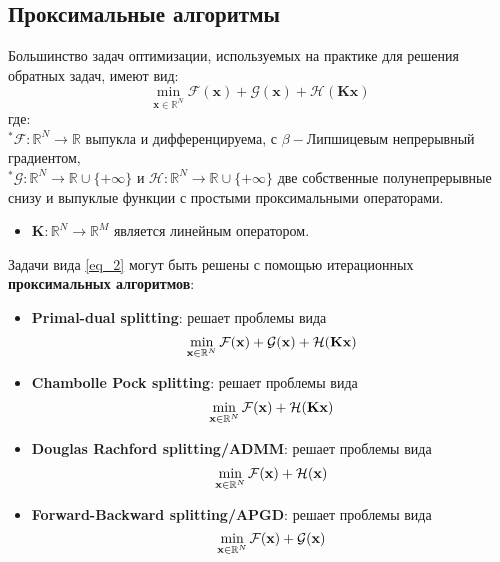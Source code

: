 \documentclass[a4paper,12pt]{article}
\theoremstyle{plain}
\theoremstyle{definition}
\theoremstyle{remark}
\begin{document}
\subsection{Проксимальные алгоритмы}
Большинство задач оптимизации, 
используемых на практике для решения обратных задач, имеют вид:
\begin{equation}
\label{eq_2}
\min_{\textbf{x} \in \mathbb{R}^N}
\mathcal{F}(\textbf{x})
+ \mathcal{G}(\textbf{x})
+ \mathcal{H}(\textbf{Kx})
\end{equation}
где:\\ 
${}^*\mathcal{F}: \mathbb{R}^N \rightarrow \mathbb{R}$
выпукла и дифференцируема, 
с $\beta-$Липшицевым непрерывный градиентом,\\
${}^*\mathcal{G}: 
\mathbb{R}^N \rightarrow \mathbb{R} \cup \{ +\infty \}$
и 
$\mathcal{H}: 
\mathbb{R}^N \rightarrow \mathbb{R} \cup \{ +\infty \}$
две собственные полунепрерывные снизу и 
выпуклые функции с простыми проксимальными операторами.
\begin{itemize}
\item 
$\textbf{K}: 
\mathbb{R}^N \rightarrow \mathbb{R}^M$
является линейным оператором. 
\end{itemize}
Задачи вида \eqref{eq_2} могут быть решены 
с помощью итерационных \textbf{проксимальных алгоритмов}:
\begin{itemize}
\item
\textbf{Primal-dual splitting}:
решает проблемы вида
\[
\min_{\textbf{x}\in \mathbb{R}^N}
\mathcal{F}(\textbf{\textbf{x}}) +
\mathcal{G}(\textbf{\textbf{x}}) +
\mathcal{H}(\textbf{\textbf{Kx}})
\]
\item
\textbf{Chambolle Pock splitting}:
решает проблемы вида
\[
\min_{\textbf{x}\in \mathbb{R}^N}
\mathcal{F}(\textbf{\textbf{x}}) +
\mathcal{H}(\textbf{\textbf{Kx}})
\]
\item
\textbf{Douglas Rachford splitting/ADMM}:
решает проблемы вида
\[
\min_{\textbf{x}\in \mathbb{R}^N}
\mathcal{F}(\textbf{\textbf{x}}) +
\mathcal{H}(\textbf{\textbf{x}})
\]
\item
\textbf{Forward-Backward splitting/APGD}:
решает проблемы вида
\[
\min_{\textbf{x}\in \mathbb{R}^N}
\mathcal{F}(\textbf{\textbf{x}}) +
\mathcal{G}(\textbf{\textbf{x}})
\]
\end{itemize}
\end{document}
